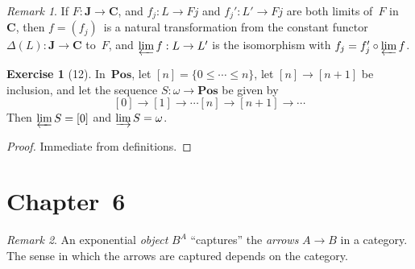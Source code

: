 \documentclass[letterpaper,12pt]{article}
\newcommand{\after}{\circ}
\newcommand{\limit}{\varprojlim}
\newcommand{\colimit}{\varinjlim}
\newcommand{\cat}[1]{\mathbf{#1}}
\newcommand{\2}{\cat{2}}
\newcommand{\C}{\cat{C}}
\newcommand{\J}{\cat{J}}
\newcommand{\Pos}{\cat{Pos}}
\theoremstyle{definition}
\newtheorem*{exer}{Exercise}
\theoremstyle{remark}
\newtheorem*{rmk}{Remark}
\theoremstyle{direction}
\begin{document}
\begin{rmk}
If \(F:\J\to\C\), and \(f_j:L\to Fj\) and \(f_j':L'\to Fj\) are both limits of~\(F\) in~\(\C\), then \(f=(f_j)\)~is a natural transformation from the constant functor \(\Delta(L):\J\to\C\) to~\(F\), and \(\limit f:L\to L'\) is the isomorphism with \(f_j=f_j'\after\limit f\).
\end{rmk}

\begin{exer}[12]
In~\(\Pos\), let \([n]=\{0\le\cdots\le n\}\), let \([n]\to[n+1]\) be inclusion, and let the sequence \(S:\omega\to\Pos\) be given by
\[[0]\to[1]\to\cdots[n]\to[n+1]\to\cdots\]
Then \(\limit S=[0]\) and \(\colimit S=\omega\).
\end{exer}
\begin{proof}
Immediate from definitions.
\end{proof}

\section*{Chapter~6}
\begin{rmk}
An exponential \emph{object} \(B^A\) ``captures'' the \emph{arrows} \(A\to B\) in a category. The sense in which the arrows are captured depends on the category.
\end{rmk}
\end{document}
